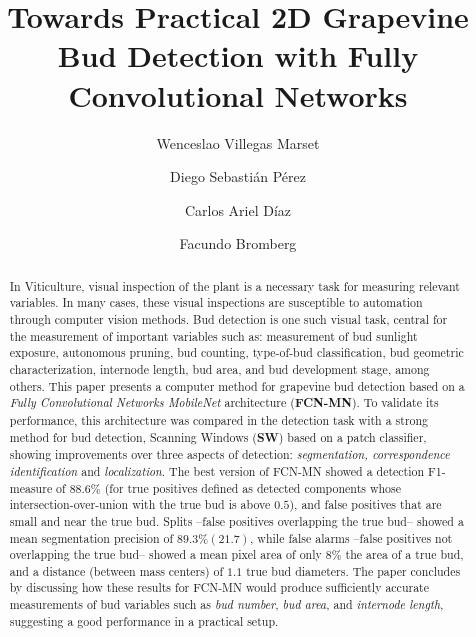 \documentclass[a4paper,authoryear,review]{elsarticle}
\begin{document}
	
	\begin{frontmatter}
		
		\title{Towards Practical 2D Grapevine Bud Detection with Fully Convolutional Networks}
		
		\author[utn]{Wenceslao Villegas Marset}
		
		\author[utn]{Diego Sebastián Pérez}
		
		\author[utn]{Carlos Ariel Díaz}
		
		\author[utn,conicet]{Facundo Bromberg}
		
		\address[utn]{Universidad Tecnológica Nacional. Dpto. de Sistemas de la Información. Grupo de Inteligencia Artificial DHARMa, Mendoza, Argentina.}
		
		\address[conicet]{Consejo Nacional de Investigaciones Científicas y Técnicas (CONICET), Argentina.}
		
		
		\begin{abstract}
			In Viticulture, visual inspection of the plant is a necessary task for measuring relevant variables. In many cases, these visual inspections are susceptible to automation through computer vision methods. Bud detection is one such visual task, central for the measurement of important variables such as: measurement of bud sunlight exposure, autonomous pruning, bud counting, type-of-bud classification, bud geometric characterization, internode length, bud area, and bud development stage, among others. This paper presents a computer method for grapevine bud detection based on a \emph{Fully Convolutional Networks MobileNet} architecture (\textbf{FCN-MN}). To validate its performance, this architecture was compared in the detection task with a strong method for bud detection, Scanning Windows (\textbf{SW}) based on a patch classifier, showing improvements over three aspects of detection: \emph{segmentation, correspondence identification} and \emph{localization}. 
			The best version of FCN-MN showed a detection F1-measure of $88.6\%$ (for true positives defined as detected components whose intersection-over-union with the true bud is above $0.5$), and false positives that are small and near the true bud. Splits --false positives overlapping the true bud-- showed a mean segmentation precision of $89.3\% (21.7)$, while false alarms --false positives not overlapping the true bud-- showed a mean pixel area of only $8\%$ the area of a true bud, and a distance (between mass centers) of $1.1$ true bud diameters. 
			The paper concludes by discussing how these results for FCN-MN would produce sufficiently accurate measurements of bud variables such as \emph{bud number}, \emph{bud area}, and \emph{internode length}, suggesting a good performance in a practical setup.
		\end{abstract}
		

\end{frontmatter}
\end{document}
